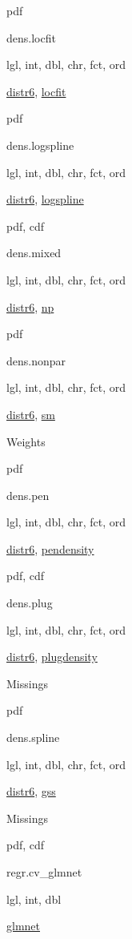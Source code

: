 \documentclass[]{article}
\begin{document}
pdf

dens.locfit

lgl, int, dbl, chr, fct, ord

\href{https://cran.r-project.org/package=distr6}{distr6}, \href{https://cran.r-project.org/package=locfit}{locfit}

pdf

dens.logspline

lgl, int, dbl, chr, fct, ord

\href{https://cran.r-project.org/package=distr6}{distr6}, \href{https://cran.r-project.org/package=logspline}{logspline}

pdf, cdf

dens.mixed

lgl, int, dbl, chr, fct, ord

\href{https://cran.r-project.org/package=distr6}{distr6}, \href{https://cran.r-project.org/package=np}{np}

pdf

dens.nonpar

lgl, int, dbl, chr, fct, ord

\href{https://cran.r-project.org/package=distr6}{distr6}, \href{https://cran.r-project.org/package=sm}{sm}

Weights

pdf

dens.pen

lgl, int, dbl, chr, fct, ord

\href{https://cran.r-project.org/package=distr6}{distr6}, \href{https://cran.r-project.org/package=pendensity}{pendensity}

pdf, cdf

dens.plug

lgl, int, dbl, chr, fct, ord

\href{https://cran.r-project.org/package=distr6}{distr6}, \href{https://cran.r-project.org/package=plugdensity}{plugdensity}

Missings

pdf

dens.spline

lgl, int, dbl, chr, fct, ord

\href{https://cran.r-project.org/package=distr6}{distr6}, \href{https://cran.r-project.org/package=gss}{gss}

Missings

pdf, cdf

regr.cv\_glmnet

lgl, int, dbl

\href{https://cran.r-project.org/package=glmnet}{glmnet}
\end{document}
